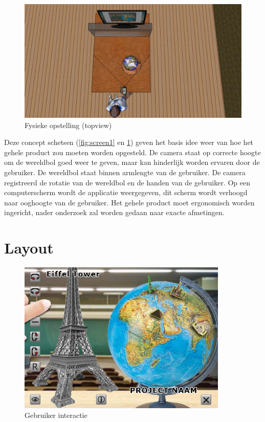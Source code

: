 \begin{figure}[h]
	\includegraphics[width=130mm]{figs/screen2.jpg}
	\caption{Fysieke opstelling (topview)}
	\label{fig:screen2}
\end{figure}

Deze concept schetsen (\cref{fig:screen1} en \cref{fig:screen2}) geven het basis idee weer van hoe het gehele product zou moeten worden opgesteld. De camera staat op correcte hoogte om de wereldbol goed weer te geven, maar kan hinderlijk worden ervaren door de gebruiker. De wereldbol staat binnen armlengte van de gebruiker. De camera registreerd de rotatie van de wereldbol en de handen van de gebruiker. Op een computerscherm wordt de applicatie weergegeven, dit scherm wordt verhoogd naar ooghoogte van de gebruiker. Het gehele product moet ergonomisch worden ingericht, nader onderzoek zal worden gedaan naar exacte afmetingen. 

\newpage
\section{Layout} \label{sec:layout}
\begin{figure}[h]
	\includegraphics[width=100mm]{figs/userexp1.jpg}
	\caption{Gebruiker interactie}
	\label{fig:userexp1}
\end{figure}

